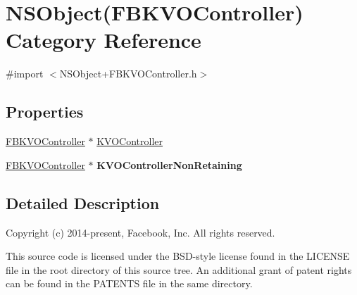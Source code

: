 \hypertarget{category_n_s_object_07_f_b_k_v_o_controller_08}{\section{N\+S\+Object(F\+B\+K\+V\+O\+Controller) Category Reference}
\label{category_n_s_object_07_f_b_k_v_o_controller_08}
}


{\ttfamily \#import $<$N\+S\+Object+\+F\+B\+K\+V\+O\+Controller.\+h$>$}

\subsection*{Properties}
\begin{DoxyCompactItemize}
\item 
\hyperlink{interface_f_b_k_v_o_controller}{F\+B\+K\+V\+O\+Controller} $\ast$ \hyperlink{category_n_s_object_07_f_b_k_v_o_controller_08_aa95ad60ae38e9a30b495e54faedeed23}{K\+V\+O\+Controller}
\item 
\hypertarget{category_n_s_object_07_f_b_k_v_o_controller_08_aab902cfd4f5e64d84693b6c179514009}{\hyperlink{interface_f_b_k_v_o_controller}{F\+B\+K\+V\+O\+Controller} $\ast$ {\bfseries K\+V\+O\+Controller\+Non\+Retaining}}\label{category_n_s_object_07_f_b_k_v_o_controller_08_aab902cfd4f5e64d84693b6c179514009}

\end{DoxyCompactItemize}


\subsection{Detailed Description}
Copyright (c) 2014-\/present, Facebook, Inc. All rights reserved.

This source code is licensed under the B\+S\+D-\/style license found in the L\+I\+C\+E\+N\+S\+E file in the root directory of this source tree. An additional grant of patent rights can be found in the P\+A\+T\+E\+N\+T\+S file in the same directory. 

